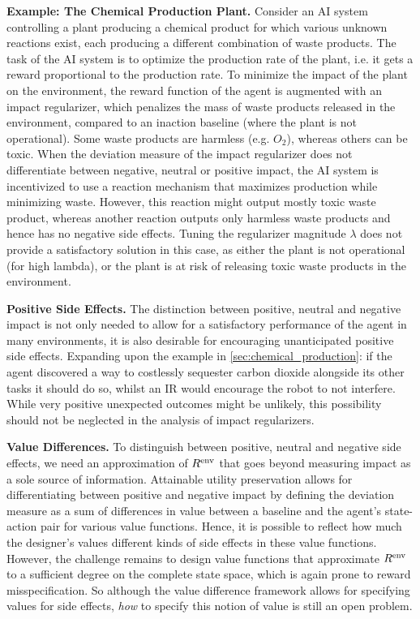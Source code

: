\documentclass[letterpaper]{article} %
\newcommand{\Rframe}{R^{\textnormal{env}}}
\newcommand{\statement}[1]{\textbf{#1}}
\begin{document}
\statement{Example: The Chemical Production Plant.}
\label{sec:chemical_production}
Consider an AI system controlling a plant producing a chemical product for which various unknown reactions exist, each producing a different combination of waste products. The task of the AI system is to optimize the production rate of the plant, i.e. it gets a reward proportional to the production rate. To minimize the impact of the plant on the environment, the reward function of the agent is augmented with an impact regularizer, which penalizes the mass of waste products released in the environment, compared to an inaction baseline (where the plant is not operational). Some waste products are harmless (e.g. $O_2$), whereas others can be toxic. When the deviation measure of the impact regularizer does not differentiate between negative, neutral or positive impact, the AI system is incentivized to use a reaction mechanism that maximizes production while minimizing waste. However, this reaction might output mostly toxic waste product, whereas another reaction outputs only harmless waste products and hence has no negative side effects. Tuning the regularizer magnitude $\lambda$ does not provide a satisfactory solution in this case, as either the plant is not operational (for high lambda), or the plant is at risk of releasing toxic waste products in the environment.


\statement{Positive Side Effects.}
The distinction between positive, neutral and negative impact is not only needed to allow for a satisfactory performance of the agent in many environments, it is also desirable for encouraging unanticipated positive side effects. Expanding upon the example in \ref{sec:chemical_production}: if the agent discovered a way to costlessly sequester carbon dioxide alongside its other tasks it should do so, whilst an IR would encourage the robot to not interfere.
While very positive unexpected outcomes might be unlikely, this possibility should not be neglected in the analysis of impact regularizers.

\statement{Value Differences.}
To distinguish between positive, neutral and negative side effects, we need an approximation of $\Rframe$ that goes beyond measuring impact as a sole source of information. Attainable utility preservation \citep{turner2020conservative} allows for differentiating between positive and negative impact by defining the deviation measure as a sum of differences in value between a baseline and the agent's state-action pair for various value functions. Hence, it is possible to reflect how much the designer's values different kinds of side effects in these value functions.
However, the challenge remains to design value functions that approximate $\Rframe$ to a sufficient degree on the complete state space, which is again prone to reward misspecification. So although the value difference framework allows for specifying values for side effects, \emph{how} to specify this notion of value is still an open problem.
\end{document}
